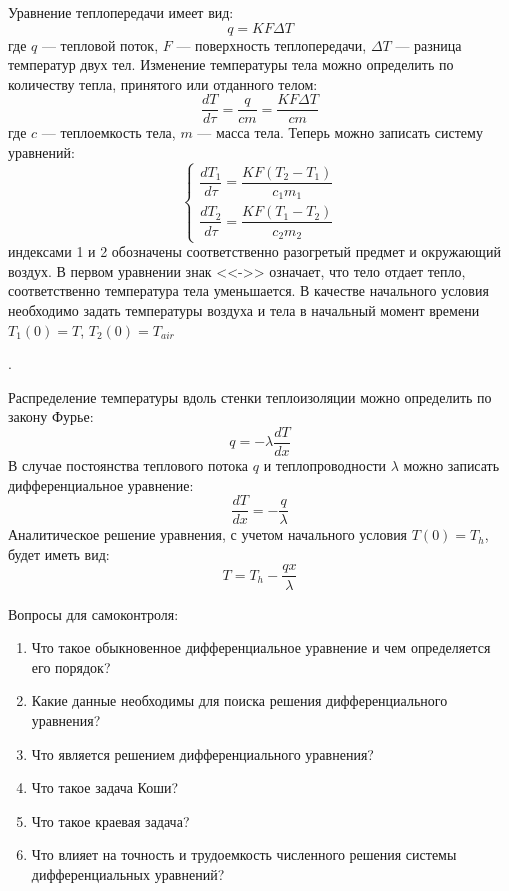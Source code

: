 Уравнение теплопередачи имеет вид:
\begin{equation}
q=K F \Delta T
\end{equation}
где $q$ --- тепловой поток, $F$ --- поверхность теплопередачи, $\Delta T$ --- разница температур двух тел. Изменение температуры тела можно определить по количеству тепла, принятого или отданного телом:
\begin{equation}
\dfrac{d T}{d \tau}=\dfrac{q}{c m} = \dfrac{K F \Delta T}{c m}
\end{equation}
где $c$ --- теплоемкость тела, $m$ --- масса тела.
Теперь можно записать систему уравнений:
\begin{equation}
\begin{cases}
\dfrac{d T_1}{d \tau} = \dfrac{K F (T_2-T_1)}{c_1 m_1} \\
\dfrac{d T_2}{d \tau} = \dfrac{K F (T_1-T_2)}{c_2 m_2}
\end{cases}
\end{equation}
индексами 1 и 2 обозначены соответственно разогретый предмет и окружающий воздух. В первом уравнении знак <<->> означает, что тело отдает тепло, соответственно температура тела уменьшается. В качестве начального условия необходимо задать температуры воздуха и тела в начальный момент времени $T_1(0) = T$, $T_2(0) = T_{air}$

.

Распределение температуры вдоль стенки теплоизоляции можно определить по закону Фурье:
\begin{equation}
q=-\lambda \dfrac{d T}{d x}
\end{equation} 
В случае постоянства теплового потока $q$ и теплопроводности $\lambda$ можно записать дифференциальное уравнение:
\begin{equation}
\dfrac{d T}{d x} =- \dfrac{q}{\lambda}
\end{equation}
Аналитическое решение уравнения, с учетом начального условия $T(0) = T_h$, будет иметь вид:
\begin{equation}
T = T_h - \dfrac{q x}{\lambda}
\end{equation}

Вопросы для самоконтроля:
\begin{enumerate}
	\item Что такое обыкновенное дифференциальное уравнение и чем определяется его порядок?
	\item Какие данные необходимы для поиска решения дифференциального уравнения?
	\item Что является решением дифференциального уравнения?
	\item Что такое задача Коши?
	\item Что такое краевая задача?
	\item Что влияет на точность и трудоемкость численного решения системы дифференциальных уравнений?
\end{enumerate}

